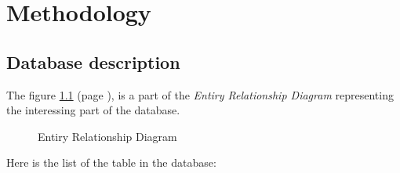 \documentclass[../main.tex]{subfiles}
\begin{document}
\chapter{Methodology} %
\label{cha:methodology}

\section{Database description} %
\label{sec:database_description}

The figure \ref{fig:erd} (page \pageref{fig:erd}), is a part of the \emph{Entiry Relationship Diagram} representing the interessing part of the database.

\begin{figure}[h]
\centering
{}
% 
\decoRule
\caption[Entiry Relationship Diagram]{Entiry Relationship Diagram}
\label{fig:erd}
\end{figure}

Here is the list of the table in the database:

\end{document}
